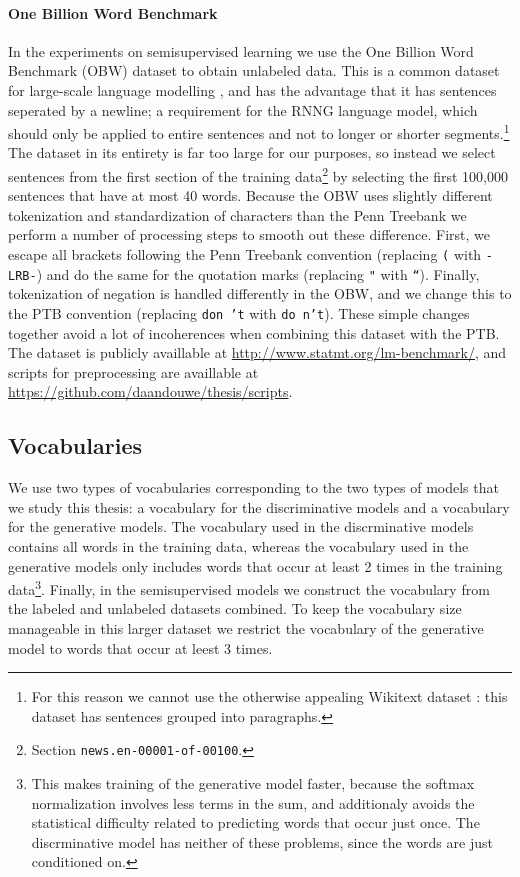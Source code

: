     \paragraph{One Billion Word Benchmark}
    In the experiments on semisupervised learning we use the One Billion Word Benchmark (OBW) dataset \citep{chelba2013one} to obtain unlabeled data. This is a common dataset for large-scale language modelling \citep{jozefowicz2016exploring}, and has the advantage that it has sentences seperated by a newline; a requirement for the RNNG language model, which should only be applied to entire sentences and not to longer or shorter segments.\footnote{For this reason we cannot use the otherwise appealing Wikitext dataset \citep{merity2016pointer}: this dataset has sentences grouped into paragraphs.} The dataset in its entirety is far too large for our purposes, so instead we select sentences from the first section of the training data\footnote{Section \texttt{news.en-00001-of-00100}.} by selecting the first 100,000 sentences that have at most 40 words. Because the OBW uses slightly different tokenization and standardization of characters than the Penn Treebank we perform a number of processing steps to smooth out these difference. First, we escape all brackets following the Penn Treebank convention (replacing \texttt{(} with \texttt{-LRB-}) and do the same for the quotation marks (replacing \texttt{"} with \texttt{``}). Finally, tokenization of negation is handled differently in the OBW, and we change this to the PTB convention (replacing \texttt{don 't} with \texttt{do n't}). These simple changes together avoid a lot of incoherences when combining this dataset with the PTB. The dataset is publicly availlable at \url{http://www.statmt.org/lm-benchmark/}, and scripts for preprocessing are availlable at \url{https://github.com/daandouwe/thesis/scripts}.

  \subsection{Vocabularies}
    We use two types of vocabularies corresponding to the two types of models that we study this thesis: a vocabulary for the discriminative models and a vocabulary for the generative models. The vocabulary used in the discrminative models contains all words in the training data, whereas the vocabulary used in the generative models only includes words that occur at least 2 times in the training data\footnote{This makes training of the generative model faster, because the softmax normalization involves less terms in the sum, and additionaly avoids the statistical difficulty related to predicting words that occur just once. The discrminative model has neither of these problems, since the words are just conditioned on.}. Finally, in the semisupervised models we construct the vocabulary from the labeled and unlabeled datasets combined. To keep the vocabulary size manageable in this larger dataset we restrict the vocabulary of the generative model to words that occur at leest 3 times.

